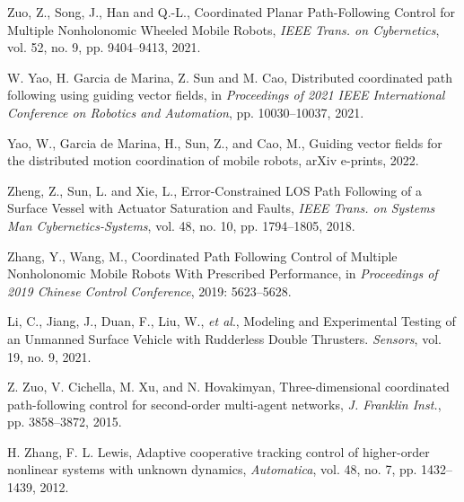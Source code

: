 \documentclass[conference,letterpaper,10.5pt]{IEEEtran}
\begin{document}
\begin{thebibliography}{0}
	 Zuo, Z., Song, J., Han and Q.-L., Coordinated Planar Path-Following Control for Multiple Nonholonomic Wheeled Mobile Robots, \emph{IEEE Trans. on Cybernetics}, vol. 52, no. 9, pp. 9404--9413, 2021.
	
	 W. Yao, H. Garcia de Marina, Z. Sun and M. Cao, Distributed coordinated path following using guiding vector fields, in \emph{Proceedings of 2021 IEEE International Conference on Robotics and Automation}, pp. 10030--10037, 2021.
	
	 Yao, W., Garcia de Marina, H., Sun, Z., and Cao, M., Guiding vector fields for the distributed motion coordination of mobile robots, arXiv e-prints, 2022.
	
	 Zheng, Z., Sun, L. and Xie, L., Error-Constrained LOS Path Following of a Surface Vessel with Actuator Saturation and Faults, \emph{IEEE Trans. on Systems Man Cybernetics-Systems}, vol. 48, no. 10, pp. 1794--1805, 2018.
	
	 Zhang, Y., Wang, M., Coordinated Path Following Control of Multiple Nonholonomic Mobile Robots With Prescribed Performance, in \emph{Proceedings of 2019 Chinese Control Conference}, 2019: 5623--5628. 
	
	 Li, C., Jiang, J., Duan, F., Liu, W., \emph{et al}., Modeling and Experimental Testing of an Unmanned Surface Vehicle with Rudderless Double Thrusters. \emph{Sensors}, vol. 19, no. 9, 2021.
	
	 Z. Zuo, V. Cichella, M. Xu, and N. Hovakimyan, Three-dimensional coordinated path-following control for second-order multi-agent networks, \emph{J. Franklin Inst.}, pp. 3858--3872, 2015.
	
	 H. Zhang, F. L. Lewis, Adaptive cooperative tracking control of higher-order nonlinear systems with unknown dynamics, \emph{Automatica}, vol. 48, no. 7, pp. 1432--1439, 2012.
	
\end{thebibliography}
\end{document}
